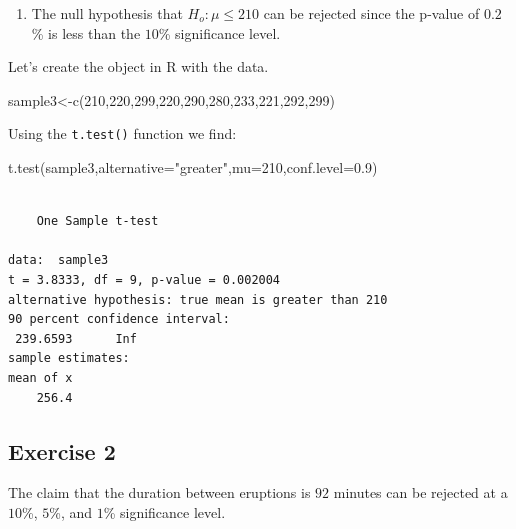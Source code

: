 \documentclass[
  letterpaper,
  DIV=11,
  numbers=noendperiod]{scrreprt}
\newenvironment{Shaded}{\begin{snugshade}}{\end{snugshade}}
\newcommand{\AttributeTok}[1]{\textcolor[rgb]{0.40,0.45,0.13}{#1}}
\newcommand{\DecValTok}[1]{\textcolor[rgb]{0.68,0.00,0.00}{#1}}
\newcommand{\FloatTok}[1]{\textcolor[rgb]{0.68,0.00,0.00}{#1}}
\newcommand{\FunctionTok}[1]{\textcolor[rgb]{0.28,0.35,0.67}{#1}}
\newcommand{\NormalTok}[1]{\textcolor[rgb]{0.00,0.23,0.31}{#1}}
\newcommand{\OtherTok}[1]{\textcolor[rgb]{0.00,0.23,0.31}{#1}}
\newcommand{\StringTok}[1]{\textcolor[rgb]{0.13,0.47,0.30}{#1}}
\providecommand{\tightlist}{%
  \setlength{\itemsep}{0pt}\setlength{\parskip}{0pt}}\usepackage{longtable,booktabs,array}
\begin{document}
\begin{enumerate}
\def\labelenumi{\arabic{enumi}.}
\setcounter{enumi}{2}
\tightlist
\item
  The null hypothesis that \(H_{o}: \mu \leq 210\) can be rejected since
  the p-value of \(0.2\)\% is less than the \(10\)\% significance level.
\end{enumerate}

Let's create the object in R with the data.

\begin{Shaded}
\begin{Highlighting}[numbers=left,,]
\NormalTok{sample3}\OtherTok{\textless{}{-}}\FunctionTok{c}\NormalTok{(}\DecValTok{210}\NormalTok{,}\DecValTok{220}\NormalTok{,}\DecValTok{299}\NormalTok{,}\DecValTok{220}\NormalTok{,}\DecValTok{290}\NormalTok{,}\DecValTok{280}\NormalTok{,}\DecValTok{233}\NormalTok{,}\DecValTok{221}\NormalTok{,}\DecValTok{292}\NormalTok{,}\DecValTok{299}\NormalTok{)}
\end{Highlighting}
\end{Shaded}

Using the \texttt{t.test()} function we find:

\begin{Shaded}
\begin{Highlighting}[numbers=left,,]
\FunctionTok{t.test}\NormalTok{(sample3,}\AttributeTok{alternative=}\StringTok{"greater"}\NormalTok{,}\AttributeTok{mu=}\DecValTok{210}\NormalTok{,}\AttributeTok{conf.level=}\FloatTok{0.9}\NormalTok{)}
\end{Highlighting}
\end{Shaded}

\begin{verbatim}

    One Sample t-test

data:  sample3
t = 3.8333, df = 9, p-value = 0.002004
alternative hypothesis: true mean is greater than 210
90 percent confidence interval:
 239.6593      Inf
sample estimates:
mean of x 
    256.4 
\end{verbatim}

\hypertarget{exercise-2-25}{%
\subsection*{Exercise 2}\label{exercise-2-25}}

The claim that the duration between eruptions is \(92\) minutes can be
rejected at a \(10\)\%, \(5\)\%, and \(1\)\% significance level.
\end{document}
